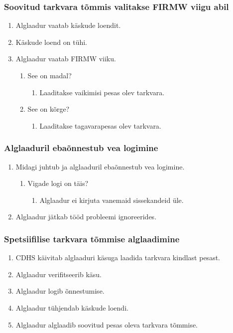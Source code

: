 \documentclass[12pt,a4paper]{article}
\begin{document}
\subsubsection{Soovitud tarkvara tõmmis valitakse FIRMW viigu abil}
\label{sec:usecase:fwselect}
\begin{enumerate}
	\item Alglaadur vaatab käskude loendit.
	\item Käskude loend on tühi.
	\item Alglaadur vaatab FIRMW viiku.
		\begin{enumerate}
			\item See on madal?
				\begin{enumerate}
					\item Laaditakse vaikimisi pesas olev tarkvara.
				\end{enumerate}
			\item See on kõrge?
				\begin{enumerate}
					\item Laaditakse tagavarapesas olev tarkvara.
				\end{enumerate}
		\end{enumerate}
\end{enumerate}

\subsubsection{Alglaaduril ebaõnnestub vea logimine}
\begin{enumerate}
	\item Midagi juhtub ja alglaaduril ebaõnnestub vea logimine.
		\begin{enumerate}
			\item Vigade logi on täis?
				\begin{enumerate}
					\item Alglaadur ei kirjuta vanemaid sissekandeid üle.
				\end{enumerate}
		\end{enumerate}
	\item Alglaadur jätkab tööd probleemi ignoreerides.
\end{enumerate}

\subsubsection{Spetsiifilise tarkvara tõmmise alglaadimine}
\begin{enumerate}
	\item CDHS käivitab alglaaduri käsuga laadida tarkvara kindlast pesast.
	\item Alglaadur verifitseerib käsu.
	\item Alglaadur logib õnnestumise.
	\item Alglaadur tühjendab käskude loendi.
	\item Alglaadur alglaadib soovitud pesas oleva tarkvara tõmmise.
\end{enumerate}
\end{document}
